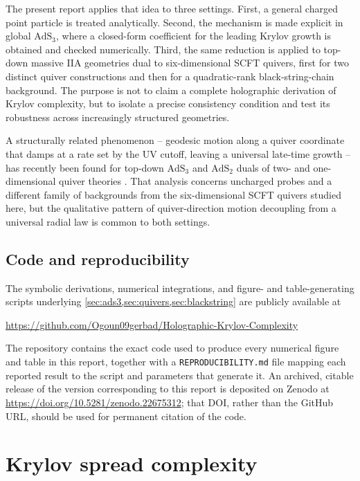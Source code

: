 \documentclass[11pt,a4paper]{article}
\theoremstyle{plain}
\theoremstyle{definition}
\theoremstyle{remark}
\begin{document}
The present report applies that idea to three settings. First, a general charged point particle is treated analytically. Second, the mechanism is made explicit in global $\mathrm{AdS}_3$, where a closed-form coefficient for the leading Krylov growth is obtained and checked numerically. Third, the same reduction is applied to top-down massive IIA geometries dual to six-dimensional SCFT quivers, first for two distinct quiver constructions and then for a quadratic-rank black-string-chain background. The purpose is not to claim a complete holographic derivation of Krylov complexity, but to isolate a precise consistency condition and test its robustness across increasingly structured geometries.

A structurally related phenomenon -- geodesic motion along a quiver coordinate that damps at a rate set by the UV cutoff, leaving a universal late-time growth -- has recently been found for top-down $\mathrm{AdS}_3$ and $\mathrm{AdS}_2$ duals of two- and one-dimensional quiver theories \cite{Fatemiabhari:2025qcg}. That analysis concerns uncharged probes and a different family of backgrounds from the six-dimensional SCFT quivers studied here, but the qualitative pattern of quiver-direction motion decoupling from a universal radial law is common to both settings.

\subsection*{Code and reproducibility}

The symbolic derivations, numerical integrations, and figure- and table-generating scripts underlying \cref{sec:ads3,sec:quivers,sec:blackstring} are publicly available at
\begin{center}
\url{https://github.com/Ogoun09gerbad/Holographic-Krylov-Complexity}
\end{center}
The repository contains the exact code used to produce every numerical figure and table in this report, together with a \texttt{REPRODUCIBILITY.md} file mapping each reported result to the script and parameters that generate it. An archived, citable release of the version corresponding to this report is deposited on Zenodo at \url{https://doi.org/10.5281/zenodo.22675312}; that DOI, rather than the GitHub URL, should be used for permanent citation of the code.

\section{Krylov spread complexity}
\label{sec:krylov}
\end{document}
